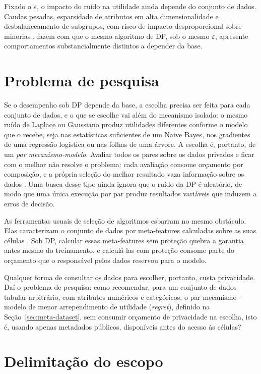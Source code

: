 Fixado o $\varepsilon$, o impacto do ruído na utilidade ainda depende do conjunto de dados. Caudas pesadas, esparsidade de atributos em alta dimensionalidade e desbalanceamento de subgrupos, com risco de impacto desproporcional sobre minorias \cite{ref05}, fazem com que o mesmo algoritmo de DP, sob o mesmo $\varepsilon$, apresente comportamentos substancialmente distintos a depender da base.

\section{Problema de pesquisa}
\label{sec:problema-pesquisa}

Se o desempenho sob DP depende da base, a escolha precisa ser feita para cada conjunto de dados, e o que se escolhe vai além do mecanismo isolado: o mesmo ruído de Laplace ou Gaussiano produz utilidades diferentes conforme o modelo que o recebe, seja nas estatísticas suficientes de um Naive Bayes, nos gradientes de uma regressão logística ou nas folhas de uma árvore. A escolha é, portanto, de um \emph{par mecanismo-modelo}. Avaliar todos os pares sobre os dados privados e ficar com o melhor não resolve o problema: cada avaliação consome orçamento por composição, e a própria seleção do melhor resultado vaza informação sobre os dados \cite{ref65}. Uma busca desse tipo ainda ignora que o ruído da DP é aleatório, de modo que uma única execução por par produz resultados variáveis que induzem a erros de decisão.

As ferramentas usuais de seleção de algoritmos esbarram no mesmo obstáculo. Elas caracterizam o conjunto de dados por meta-features calculadas sobre as suas células \cite{ref26,ref33}. Sob DP, calcular essas meta-features sem proteção quebra a garantia antes mesmo do treinamento, e calculá-las com proteção consome parte do orçamento que o responsável pelos dados reservou para o modelo.

Qualquer forma de consultar os dados para escolher, portanto, custa privacidade. Daí o problema de pesquisa: como recomendar, para um conjunto de dados tabular arbitrário, com atributos numéricos e categóricos, o par mecanismo-modelo de menor arrependimento de utilidade (\textit{regret}), definido na Seção~\ref{sec:meta-dataset}, sem consumir orçamento de privacidade na escolha, isto é, usando apenas metadados públicos, disponíveis antes do acesso às células?

\section{Delimitação do escopo}
\label{sec:delimitacao-problema}

